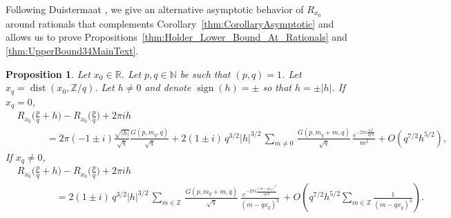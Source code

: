 \documentclass[11pt,reqno]{amsart}
\newtheorem{prop}[thm]{Proposition}
\theoremstyle{definition}
\begin{document}
Following Duistermaat \cite{Duistermaat1991}, 
we give an alternative asymptotic behavior of $R_{x_0}$ around rationals that complements Corollary~\ref{thm:CorollaryAsymptotic} and allows us to prove Propositions~\ref{thm:Holder_Lower_Bound_At_Rationals}
and \ref{thm:UpperBound34MainText}.

\begin{prop}\label{thm:Asymptotic_Alternative}
Let $x_0 \in \mathbb R$. Let $p,q \in \mathbb N$ be such that $(p,q)=1$. 
Let $x_q = \operatorname{dist}(x_0, \mathbb Z/q)$.
Let $h \neq 0$ and denote $\operatorname{sign}(h) = \pm$ so that $h = \pm |h|$. 
If $x_q = 0$,
	\begin{equation}\label{eq:Asymptotic_xq_Equal_0}
\begin{split}
&R_{x_0}\Big( \frac{p}{q} + h \Big) - R_{x_0}\Big( \frac{p}{q} \Big) + 2\pi i h   \\
& \qquad   \quad = 2\pi (- 1 \pm i) \frac{\sqrt{|h|}}{\sqrt{q}} \frac{ G(p,m_q,q)}{\sqrt{q}} 
+  2 (1 \pm i) \, q^{3/2} |h|^{3/2} \,\sum_{m \neq 0} \, \frac{ G(p,m_q + m,q)}{\sqrt{q}} \,  \frac{e^{- 2\pi i \frac{m^2}{4 q^2 h}}}{ m^2}
 + O\left( q^{7/2} h^{5/2}  \right),
 \end{split}
\end{equation}
If $x_q \neq 0$,
	\begin{equation}\label{eq:Asymptotic_xq_Not_0}
\begin{split}
& R_{x_0}\Big( \frac{p}{q} + h \Big) - R_{x_0}\Big( \frac{p}{q} \Big) + 2\pi i h  \\
& \qquad \qquad 
= 2 (1 \pm i)  \, q^{3/2} |h|^{3/2} \,\sum_{m \in \mathbb Z} \, \frac{ G(p,m_q + m,q)}{\sqrt{q}} \,  
\frac{e^{- 2\pi i \frac{(m - qx_q)^2}{4 q^2 h}}}{ (m - qx_q)^2} \,  + O\left( q^{7/2} h^{5/2} \sum_{m \in \mathbb Z} \frac{1 }{(m - qx_q)^4}  \right).
\end{split}
\end{equation}
\end{prop}
\end{document}
